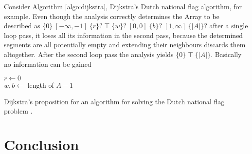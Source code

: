 \documentclass{report}
\newcommand{\bound}[1]{\{#1\}}
\newcommand{\fvalue}[1]{\;#1\;}
\begin{document}
 Consider Algorithm \ref{algo:dijkstra}, Dijkstra's Dutch national flag algorithm, for example. Even though the analysis correctly determines the Array to be described as $\bound{0} \fvalue{[-\infty, -1]} \bound{r}? \fvalue{\top} \bound{w}? \fvalue{[0, 0]} \bound{b}? \fvalue{[1, \infty]}  \bound{|A|}?$ after a single loop pass, it loses all its information in the second pass, because the determined segments are all potentially empty and extending their neighbours discards them altogether. After the second loop pass the analysis yields $\bound{0} \fvalue{\top} \bound{|A|}$. Basically no information can be gained   
 
 \begin{algorithm}
\DecMargin{5mm}
\vspace{1.5mm}
$r \leftarrow 0$\\
$w,b \leftarrow$ length of $A-1$ \\
\vspace{1.5mm}
\caption{Dijkstra's proposition for an algorithm for solving the Dutch national flag problem \cite{dijkstra1976}. }\label{algo:dijkstra}
\end{algorithm}

\chapter{Conclusion}



\newpage


\end{document}
